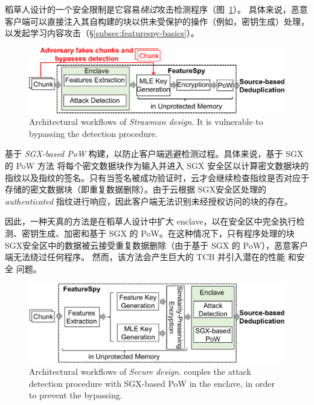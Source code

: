 稻草人设计的一个安全限制是它容易{\em 绕过}攻击检测程序（图~\ref{fig:featurespy-architecture-strawman}）。 具体来说，恶意客户端可以直接注入其自构建的块以供未受保护的操作（例如，密钥生成）处理，以发起学习内容攻击（\S\ref{subsec:featurespy-basics}）。


\begin{figure}
  \centering
  \includegraphics[width=\textwidth]{pic/featurespy/naive.pdf}
  \caption{Architectural workflows of \textit{Strawman design}. It is vulnerable to bypassing the detection procedure.}
  \label{fig:featurespy-architecture-strawman}
\end{figure}

\sysnameF 基于 {\em SGX-based PoW} \cite{ren21} 构建，以防止客户端逃避检测过程。具体来说，基于 SGX 的 PoW 方法 \cite{ren21} 将每个密文数据块作为输入并进入 SGX 安全区以计算密文数据块的指纹以及指纹的签名。只有当签名被成功验证时，云才会继续检查指纹是否对应于存储的密文数据块（即重复数据删除）。由于云根据 SGX安全区处理的 {\em authenticated} 指纹进行响应，因此客户端无法识别未经授权访问的块的存在。

因此，一种天真的方法是在稻草人设计中扩大 enclave，以在安全区中完全执行检测、密钥生成、加密和基于 SGX 的 PoW。在这种情况下，只有程序处理的块SGX安全区中的数据被云接受重复数据删除（由于基于 SGX 的 PoW），恶意客户端无法绕过任何程序。
然而，该方法会产生巨大的 TCB 并引入潜在的性能 \cite{arnautov2016SCONE, harnik18, dinhngoc19} 和安全 \cite{lie05} 问题。

\begin{figure}
  \centering
  \includegraphics[width=\textwidth]{pic/featurespy/architecture.pdf}
  \caption{Architectural workflows of \textit{Secure design}. \sysnameF couples the attack detection procedure with SGX-based PoW \cite{ren21} in the enclave, in order to prevent the bypassing.}
  \label{fig:featurespy-architecture-secure}
\end{figure}

